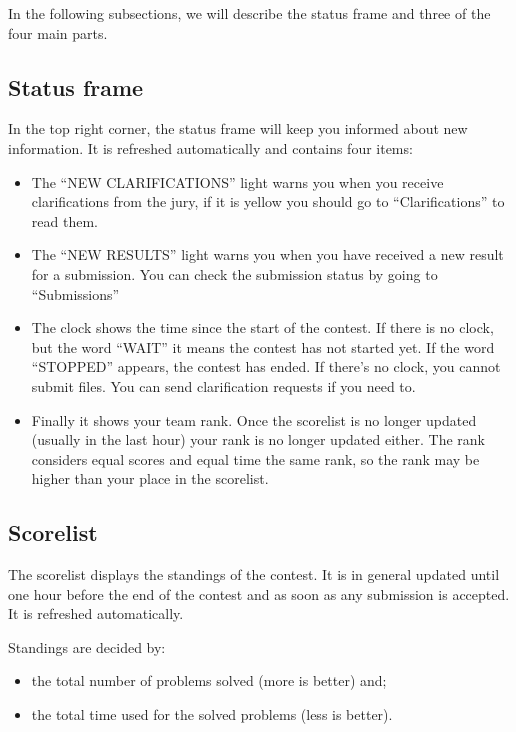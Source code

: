 \documentclass[a4paper]{artikel3}
\begin{document}
In the following subsections, we will describe the status
frame and three of the four main parts.

\subsection{Status frame}

In the top right corner, the status frame will keep you informed about new
information. It is refreshed automatically and contains four items:

\begin{itemize}
\item The ``NEW CLARIFICATIONS'' light warns you when you receive
clarifications from the jury, if it is yellow you should go to
``Clarifications'' to read them.

\item The ``NEW RESULTS'' light warns you when you have received a new result
for a submission. You can check the submission status by going to
``Submissions''

\item The clock shows the time since the start of the contest. If there is
no clock, but the word ``WAIT'' it means the contest has not started yet. If
the word ``STOPPED'' appears, the contest has ended. If there's no clock, you
cannot submit files. You can send clarification requests if you need to.

\item Finally it shows your team rank. Once the scorelist is no longer
updated (usually in the last hour) your rank is no longer updated either.
The rank considers equal scores and equal time the same rank, so the rank
may be higher than your place in the scorelist.

\end{itemize}

\subsection{Scorelist}

The scorelist displays the standings of the contest. It is in general
updated until one hour before the end of the contest and as soon as any
submission is accepted. It is refreshed automatically.

Standings are decided by:

\begin{itemize}
\item the total number of problems solved (more is better) and;
\item the total time used for the solved problems (less is better).
\end{itemize}
\end{document}
